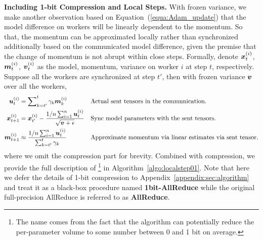 \textbf{Including 1-bit Compression and Local Steps.}
With frozen variance, we make another observation based on Equation~(\ref{equa:Adam_update}) that the model difference on workers will be linearly dependent to the momentum. So that, the momentum can be approximated locally rather than synchronized additionally based on the communicated model difference, given the premise that the change of momentum is not abrupt within close steps. Formally, denote $\boldsymbol{x}_t^{(i)}$, $\boldsymbol{m}_t^{(i)}$, $\boldsymbol{v}_t^{(i)}$ as the model, momentum, variance on worker $i$ at step $t$, respectively. Suppose all the workers are synchronized at step $t'$, then with frozen variance $\boldsymbol{v}$ over all the workers,
\begin{align*}
\boldsymbol{u}_t^{(i)} &= \sum\nolimits_{k=t'}^{t}\gamma_k\boldsymbol{m}_k^{(i)} && \text{Actual sent tensors in the communication.} \\
\boldsymbol{x}_{t+1}^{(i)} &= \boldsymbol{x}_{t'}^{(i)} - \frac{1/n\sum\nolimits_{i=1}^{n}\boldsymbol{u}_t^{(i)}}{\sqrt{\boldsymbol{v}+\epsilon}} && \text{Sync model parameters with the sent tensors.} \\
\boldsymbol{m}_{t+1}^{(i)} &\approx \frac{1/n\sum\nolimits_{i=1}^{n}\boldsymbol{u}_t^{(i)}}{\sum\nolimits_{k=t'}^{t}\gamma_k} && \text{Approximate momentum via linear estimates via sent tensor.}
\end{align*}
where we omit the compression part for brevity.
Combined with compression, we provide the full description of {\myalgo}\footnote{The name comes from the fact that the algorithm can potentially reduce the per-parameter volume to some number between 0 and 1 bit on average.} in Algorithm~\ref{algo:localstep01}.
Note that here we defer the details of 1-bit compression to Appendix~\ref{appendix:sec:algorithm} and treat it as a black-box procedure named \textbf{1bit-AllReduce} while the original full-precision AllReduce is referred to as \textbf{AllReduce}. 

